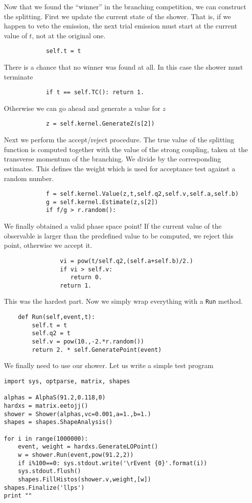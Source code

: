 \documentclass[10pt,fleqn]{scrartcl}
\begin{document}
Now that we found the ``winner'' in the branching competition, we can construct
the splitting. First we update the current state of the shower. That is,
if we happen to veto the emission, the next trial emission must start at the current
value of $t$, not at the original one.
\begin{verbatim}
            self.t = t
\end{verbatim}
There is a chance that no winner was found at all. In this case the shower must 
terminate
\begin{verbatim}
            if t == self.TC(): return 1.
\end{verbatim}
Otherwise we can go ahead and generate a value for $z$
\begin{verbatim}
            z = self.kernel.GenerateZ(s[2])
\end{verbatim}
Next we perform the accept/reject procedure. The true value of the splitting function
is computed together with the value of the strong coupling, taken at the transverse 
momentum of the branching. We divide by the corresponding estimates. This defines
the weight which is used for acceptance test against a random number.
\begin{verbatim}
            f = self.kernel.Value(z,t,self.q2,self.v,self.a,self.b)
            g = self.kernel.Estimate(z,s[2])
            if f/g > r.random():
\end{verbatim}
We finally obtained a valid phase space point! If the current value of the observable
is larger than the predefined value to be computed, we reject this point, otherwise
we accept it.
\begin{verbatim}
                vi = pow(t/self.q2,(self.a+self.b)/2.)
                if vi > self.v:
                   return 0.
                return 1.
\end{verbatim}
This was the hardest part. Now we simply wrap everything with a {\tt Run} method.
\begin{verbatim}
    def Run(self,event,t):
        self.t = t
        self.q2 = t
        self.v = pow(10.,-2.*r.random())
        return 2. * self.GeneratePoint(event)
\end{verbatim}
We finally need to use our shower. Let us write a simple test program
\begin{verbatim}
import sys, optparse, matrix, shapes

alphas = AlphaS(91.2,0.118,0)
hardxs = matrix.eetojj()
shower = Shower(alphas,vc=0.001,a=1.,b=1.)
shapes = shapes.ShapeAnalysis()

for i in range(1000000):
    event, weight = hardxs.GenerateLOPoint()
    w = shower.Run(event,pow(91.2,2))
    if i%100==0: sys.stdout.write('\rEvent {0}'.format(i))
    sys.stdout.flush()
    shapes.FillHistos(shower.v,weight,[w])
shapes.Finalize('llps')
print ""
\end{verbatim}
\end{document}
